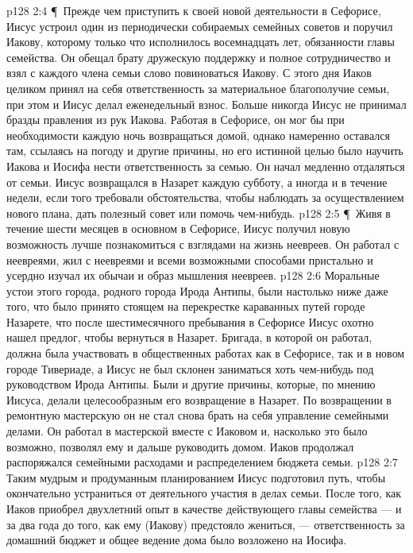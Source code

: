 \vs p128 2:4 \P\ Прежде чем приступить к своей новой деятельности в Сефорисе, Иисус устроил один из периодически собираемых семейных советов и поручил Иакову, которому только что исполнилось восемнадцать лет, обязанности главы семейства. Он обещал брату дружескую поддержку и полное сотрудничество и взял с каждого члена семьи слово повиноваться Иакову. С этого дня Иаков целиком принял на себя ответственность за материальное благополучие семьи, при этом и Иисус делал еженедельный взнос. Больше никогда Иисус не принимал бразды правления из рук Иакова. Работая в Сефорисе, он мог бы при необходимости каждую ночь возвращаться домой, однако намеренно оставался там, ссылаясь на погоду и другие причины, но его истинной целью было научить Иакова и Иосифа нести ответственность за семью. Он начал медленно отдаляться от семьи. Иисус возвращался в Назарет каждую субботу, а иногда и в течение недели, если того требовали обстоятельства, чтобы наблюдать за осуществлением нового плана, дать полезный совет или помочь чем\hyp{}нибудь.
\vs p128 2:5 \P\ Живя в течение шести месяцев в основном в Сефорисе, Иисус получил новую возможность лучше познакомиться с взглядами на жизнь неевреев. Он работал с неевреями, жил с неевреями и всеми возможными способами пристально и усердно изучал их обычаи и образ мышления неевреев.
\vs p128 2:6 Моральные устои этого города, родного города Ирода Антипы, были настолько ниже даже того, что было принято стоящем на перекрестке караванных путей городе Назарете, что после шестимесячного пребывания в Сефорисе Иисус охотно нашел предлог, чтобы вернуться в Назарет. Бригада, в которой он работал, должна была участвовать в общественных работах как в Сефорисе, так и в новом городе Тивериаде, а Иисус не был склонен заниматься хоть чем\hyp{}нибудь под руководством Ирода Антипы. Были и другие причины, которые, по мнению Иисуса, делали целесообразным его возвращение в Назарет. По возвращении в ремонтную мастерскую он не стал снова брать на себя управление семейными делами. Он работал в мастерской вместе с Иаковом и, насколько это было возможно, позволял ему и дальше руководить домом. Иаков продолжал распоряжался семейными расходами и распределением бюджета семьи.
\vs p128 2:7 Таким мудрым и продуманным планированием Иисус подготовил путь, чтобы окончательно устраниться от деятельного участия в делах семьи. После того, как Иаков приобрел двухлетний опыт в качестве действующего главы семейства --- и за два года до того, как ему (Иакову) предстояло жениться, --- ответственность за домашний бюджет и общее ведение дома было возложено на Иосифа.
